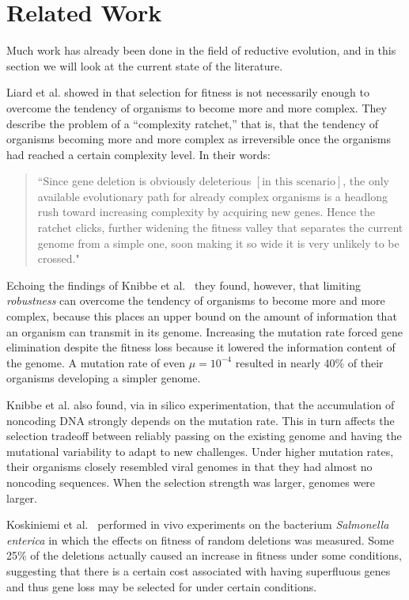 \section{Related Work}\label{related_work}
Much work has already been done in the field of reductive evolution, and in this section we will look at the current state of the literature. 

Liard et al. showed in \cite{doi:10.1162} that selection for fitness is not necessarily enough to overcome the tendency of organisms to become more and more complex. They describe the problem of a ``complexity ratchet,'' that is, that the tendency of organisms becoming more and more complex as irreversible once the organisms had reached a certain complexity level. In their words:
\begin{quote}
	``Since gene deletion is obviously deleterious $\left[\text{in this scenario}\right]$, the only available evolutionary path for already complex organisms is a headlong rush toward increasing complexity by acquiring new genes. Hence the ratchet clicks, further widening the fitness valley that separates the current genome from a simple one, soon making it so wide it is very unlikely to be crossed."
\end{quote} 
Echoing the findings of Knibbe et al.~\cite{Knibbe2007} they found, however, that limiting \textit{robustness} can overcome the tendency of organisms to become more and more complex, because this places an upper bound on the amount of information that an organism can transmit in its genome. Increasing the mutation rate forced gene elimination despite the fitness loss because it lowered the information content of the genome. A mutation rate of even $\mu = 10^{-4}$ resulted in nearly 40\% of their organisms developing a simpler genome. 

Knibbe et al. also found, via in silico experimentation, that the accumulation of noncoding DNA strongly depends on the mutation rate. This in turn affects the selection tradeoff between reliably passing on the existing genome and having the mutational variability to adapt to new challenges.  Under higher mutation rates, their organisms closely resembled viral genomes in that they had almost no noncoding sequences. When the selection strength was larger, genomes were larger. 

Koskiniemi et al.~\cite{koskiniemi2012} performed in vivo experiments on the bacterium \textit{Salmonella enterica} in which the effects on fitness of random deletions was measured. Some 25\% of the deletions actually caused an increase in fitness under some conditions, suggesting that there is a certain cost associated with having superfluous genes and thus gene loss may be selected for under certain conditions.





